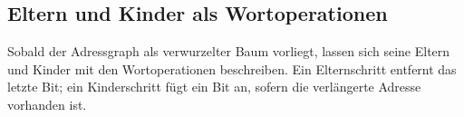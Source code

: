 \begin{tabproofwide}
\end{tabproofwide}

\subsection{Eltern und Kinder als Wortoperationen}

Sobald der Adressgraph als verwurzelter Baum vorliegt, lassen sich seine
Eltern und Kinder mit den Wortoperationen beschreiben. Ein Elternschritt
entfernt das letzte Bit; ein Kinderschritt fügt ein Bit an, sofern die verlängerte Adresse vorhanden ist.

